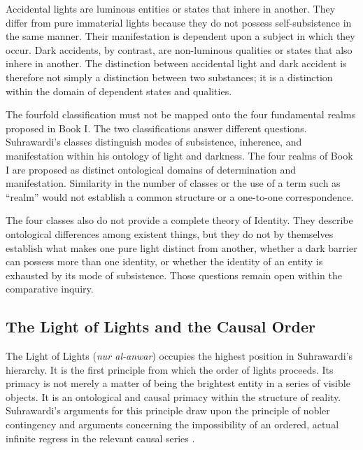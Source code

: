 Accidental lights are luminous entities or states
that inhere in another. They differ from pure
immaterial lights because they do not possess
self-subsistence in the same manner. Their
manifestation is dependent upon a subject in
which they occur. Dark accidents, by contrast,
are non-luminous qualities or states that also
inhere in another. The distinction between
accidental light and dark accident is therefore
not simply a distinction between two substances;
it is a distinction within the domain of dependent
states and qualities.

\label{para:VS.B01.P01.C08.S14.SS07.P005}

The fourfold classification must not be mapped
onto the four fundamental realms proposed in
Book I. The two classifications answer different
questions. Suhrawardi's classes distinguish
modes of subsistence, inherence, and manifestation
within his ontology of light and darkness. The
four realms of Book I are proposed as distinct
ontological domains of determination and
manifestation. Similarity in the number of
classes or the use of a term such as ``realm''
would not establish a common structure or
a one-to-one correspondence.

\label{para:VS.B01.P01.C08.SS07.P006}

The four classes also do not provide a complete
theory of Identity. They describe ontological
differences among existent things, but they do
not by themselves establish what makes one
pure light distinct from another, whether a
dark barrier can possess more than one identity,
or whether the identity of an entity is exhausted
by its mode of subsistence. Those questions
remain open within the comparative inquiry.


\subsection{The Light of Lights and the Causal Order}
\label{sec:ch08-s14-ss08}

\label{para:VS.B01.P01.C08.S14.SS08.P001}

The Light of Lights (\textit{nur al-anwar}) occupies the
highest position in Suhrawardi's hierarchy. It is
the first principle from which the order of lights
proceeds. Its primacy is not merely a matter of
being the brightest entity in a series of visible
objects. It is an ontological and causal primacy
within the structure of reality. Suhrawardi's
arguments for this principle draw upon the
principle of nobler contingency and arguments
concerning the impossibility of an ordered,
actual infinite regress in the relevant causal
series \citep[Part II, §§129--138, 164--173]{SuhrawardiPhilosophyIllumination}.

